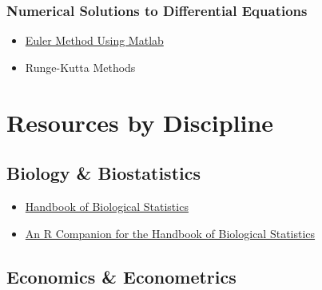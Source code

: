 \documentclass[]{book}
\providecommand{\tightlist}{%
  \setlength{\itemsep}{0pt}\setlength{\parskip}{0pt}}
\begin{document}
\hypertarget{numerical-solutions-to-differential-equations}{%
\subsection{Numerical Solutions to Differential Equations}\label{numerical-solutions-to-differential-equations}}

\begin{itemize}
\tightlist
\item
  \href{http://www.ohiouniversityfaculty.com/youngt/IntNumMeth/lecture30.pdf}{Euler Method Using Matlab}
\item
  Runge-Kutta Methods
\end{itemize}

\hypertarget{resources-by-discipline}{%
\chapter*{Resources by Discipline}\label{resources-by-discipline}}

\hypertarget{biology-biostatistics}{%
\section*{Biology \& Biostatistics}\label{biology-biostatistics}}

\begin{itemize}
\tightlist
\item
  \href{http://www.biostathandbook.com/}{Handbook of Biological Statistics}
\item
  \href{https://rcompanion.org/rcompanion/index.html}{An R Companion for the Handbook of Biological Statistics}
\end{itemize}

\hypertarget{economics-econometrics}{%
\section*{Economics \& Econometrics}\label{economics-econometrics}}
\end{document}
